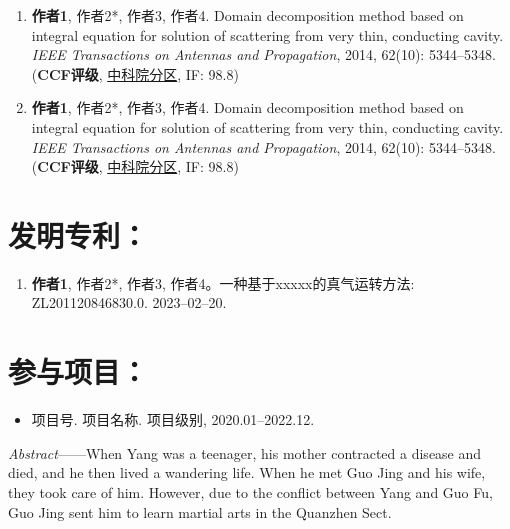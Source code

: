 \documentclass[doctor, vlined]{DissertUESTC}
\begin{document}
	\begin{enumerate}
	    \item \textbf{作者1}, 作者2*, 作者3, 作者4. Domain decomposition method based on integral equation for solution of scattering from very thin, conducting cavity. \emph{IEEE Transactions on Antennas and Propagation}, 2014, 62(10): 5344--5348. (\textbf{CCF评级}, \underline{中科院分区}, IF: 98.8)
	    
		\setcounter{enumi}{98}
	    
		\item \textbf{作者1}, 作者2*, 作者3, 作者4. Domain decomposition method based on integral equation for solution of scattering from very thin, conducting cavity. \emph{IEEE Transactions on Antennas and Propagation}, 2014, 62(10): 5344--5348. (\textbf{CCF评级}, \underline{中科院分区}, IF: 98.8)
	\end{enumerate}
	
	\newpage%
	\section*{发明专利：}
	
	\begin{enumerate}
		
		\item \textbf{作者1}, 作者2*, 作者3, 作者4。一种基于xxxxx的真气运转方法: ZL201120846830.0. 2023--02--20.
		
	\end{enumerate}
	
	\section*{参与项目：}
	
	\begin{itemize}
		\item 项目号. 项目名称. 项目级别, 2020.01--2022.12.
	\end{itemize}




	\textit{Abstract}——When Yang was a teenager, his mother contracted a disease and died, and he then lived a wandering life. When he met Guo Jing and his wife, they took care of him. However, due to the conflict between Yang and Guo Fu, Guo Jing sent him to learn martial arts in the Quanzhen Sect.
\end{document}
